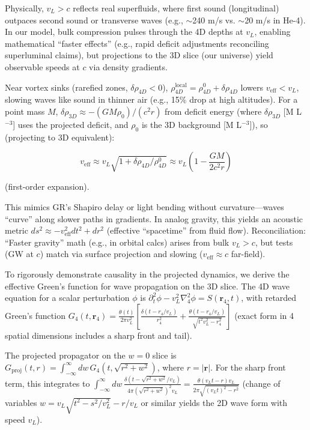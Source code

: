\documentclass{article}
\begin{document}
Physically, $v_L > c$ reflects real superfluids, where first sound (longitudinal) outpaces second sound or transverse waves (e.g., $\sim$240 m/s vs. $\sim$20 m/s in He-4). In our model, bulk compression pulses through the 4D depths at $v_L$, enabling mathematical ``faster effects'' (e.g., rapid deficit adjustments reconciling superluminal claims), but projections to the 3D slice (our universe) yield observable speeds at $c$ via density gradients.

Near vortex sinks (rarefied zones, $\delta \rho_{4D} < 0$), $\rho_{4D}^{\text{local}} = \rho_{4D}^0 + \delta \rho_{4D}$ lowers $v_{\text{eff}} < v_L$, slowing waves like sound in thinner air (e.g., 15\% drop at high altitudes). For a point mass $M$, $\delta \rho_{3D} \approx - (G M \rho_0) / (c^2 r)$ from deficit energy (where $\delta \rho_{3D}$ [M L$^{-3}$] uses the projected deficit, and $\rho_0$ is the 3D background [M L$^{-3}$]), so (projecting to 3D equivalent):

\[
v_{\text{eff}} \approx v_L \sqrt{1 + \delta \rho_{4D} / \rho_{4D}^0} \approx v_L \left(1 - \frac{G M}{2 c^2 r}\right)
\]

(first-order expansion).

This mimics GR's Shapiro delay or light bending without curvature---waves ``curve'' along slower paths in gradients. In analog gravity, this yields an acoustic metric $ds^2 \approx - v_{\text{eff}}^2 dt^2 + dr^2$ (effective ``spacetime'' from fluid flow). Reconciliation: ``Faster gravity'' math (e.g., in orbital calcs) arises from bulk $v_L > c$, but tests (GW at $c$) match via surface projection and slowing ($v_{\text{eff}} \approx c$ far-field).

To rigorously demonstrate causality in the projected dynamics, we derive the effective Green's function for wave propagation on the 3D slice. The 4D wave equation for a scalar perturbation $\phi$ is $\partial_t^2 \phi - v_L^2 \nabla_4^2 \phi = S(\mathbf{r}_4, t)$, with retarded Green's function $G_4(t, \mathbf{r}_4) = \frac{\theta(t)}{2\pi v_L^2} \left[ \frac{\delta(t - r_4 / v_L)}{r_4^2} + \frac{\theta(t - r_4 / v_L)}{\sqrt{t^2 v_L^2 - r_4^2}} \right]$ (exact form in 4 spatial dimensions includes a sharp front and tail).

The projected propagator on the $w=0$ slice is $G_{\text{proj}}(t, r) = \int_{-\infty}^\infty dw \, G_4(t, \sqrt{r^2 + w^2})$, where $r = |\mathbf{r}|$. For the sharp front term, this integrates to $\int_{-\infty}^\infty dw \, \frac{\delta(t - \sqrt{r^2 + w^2} / v_L)}{4\pi (\sqrt{r^2 + w^2})^2 v_L} = \frac{\theta(v_L t - r) v_L}{2\pi \sqrt{(v_L t)^2 - r^2}}$ (change of variables $w = v_L \sqrt{t^2 - s^2 / v_L^2} - r / v_L$ or similar yields the 2D wave form with speed $v_L$).
\end{document}
